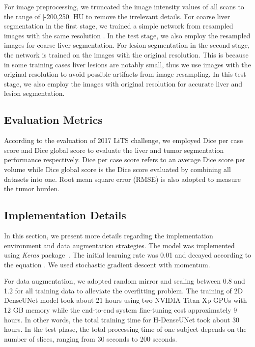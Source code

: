 \documentclass[journal]{IEEEtran}
\begin{document}
For image preprocessing, we truncated the image intensity values of all scans to the range of [-200,250] HU to remove the irrelevant details.
For coarse liver segmentation in the first stage, we trained a simple network from resampled images with the same resolution . In the test stage, we also employ the resampled images for coarse  liver segmentation. For lesion segmentation in the second stage, the network is trained on the images with the original resolution. This is because in some training cases liver lesions are notably small, thus we use images with the original resolution to avoid possible artifacts from image resampling. In this test stage, we also employ the images with original resolution for accurate liver and lesion segmentation.

\subsection{Evaluation Metrics}
According to the evaluation of 2017 LiTS challenge, we employed Dice per case score and Dice global score to evaluate the liver and tumor segmentation performance respectively.
Dice per case score refers to an average Dice score per volume while Dice global score is the Dice score evaluated by combining all datasets into one.
Root mean square error (RMSE) is also adopted to measure the tumor burden.


\subsection{Implementation Details}
In this section, we present more details regarding the implementation environment and data augmentation strategies.
The model was implemented using \emph{Keras} package~\citep{chollet2015keras}.
The initial learning rate was 0.01 and decayed according to the equation . We used stochastic gradient descent with momentum.

For data augmentation, we adopted random mirror and scaling between 0.8 and 1.2 for all training data to alleviate the overfitting problem.
The training of 2D DenseUNet model took about 21 hours using two NVIDIA Titan Xp GPUs with 12 GB memory while the end-to-end system fine-tuning cost approximately 9 hours.
In other words, the total training time for H-DenseUNet took about 30 hours.
In the test phase, the total processing time of one subject depends on the number of slices, ranging from 30 seconds to 200 seconds.
\end{document}
